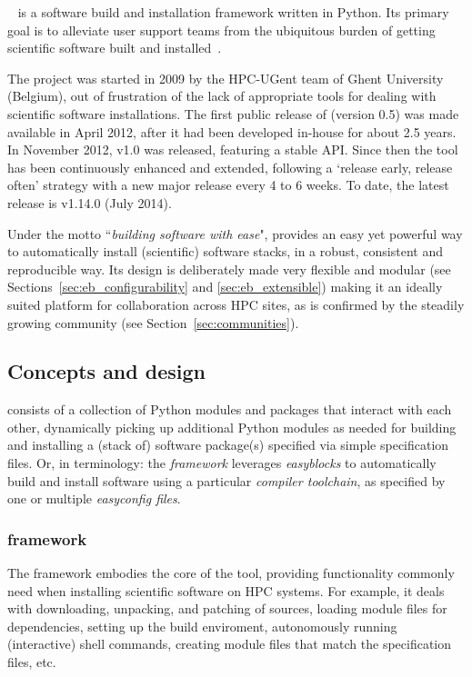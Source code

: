 \easybuild{}~\cite{EasyBuildSC12} is a software build and installation framework
written in Python. Its primary goal is to alleviate user support teams from the
ubiquitous burden of getting scientific software built and installed~\cite{Dubois03}.

The \easybuild{} project was started in 2009 by the HPC-UGent team of Ghent
University (Belgium), out of frustration of the lack of appropriate tools for dealing
with scientific software installations. The first public release of \easybuild{} (version 0.5) was made available in April 2012, after it had been developed in-house for 
about 2.5 years. In November 2012, \easybuild{} v1.0 was released, featuring
a stable API. Since then the tool has been continuously enhanced and extended,
following a `release early, release often' strategy with a new major release every
4 to 6 weeks. To date, the latest release is \easybuild{} v1.14.0 (July 2014).

Under the motto ``\emph{building software with ease}", \easybuild{} provides an easy
yet powerful way to automatically install (scientific) software stacks, in a robust,
consistent and reproducible way. Its design is deliberately made very flexible and
modular (see Sections~\ref{sec:eb_configurability} and \ref{sec:eb_extensible})
making it an ideally suited platform for collaboration across HPC sites, as is
confirmed by the steadily growing \easybuild{} community (see
Section~\ref{sec:communities}).

\subsection{Concepts and design}

\easybuild{} consists of a collection of Python modules and packages that
interact with each other, dynamically picking up additional Python modules as needed
for building and installing a (stack of) software package(s) specified via simple
specification files. Or, in \easybuild{} terminology: the \easybuild{}
\emph{framework} leverages \emph{easyblocks} to automatically build and install
software using a particular \emph{compiler toolchain}, as specified by one or
multiple \emph{easyconfig files}.

\subsubsection{\easybuild{} framework}
\label{sec:eb_framework}

The \easybuild{} framework embodies the core of the tool,
providing functionality commonly need when installing scientific software on HPC
systems. For example, it deals with downloading, unpacking, and patching of sources,
loading module files for dependencies, setting up the build enviroment, autonomously
running (interactive) shell commands, creating module files that match the
specification files, etc.


